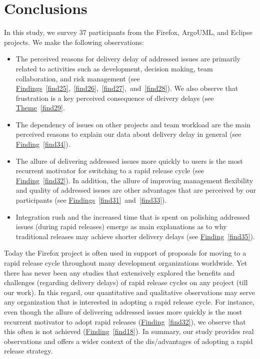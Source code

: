 \section{Conclusions} \label{ch6:conclusion}

In this study, we survey 37 participants from the Firefox, ArgoUML,
and Eclipse projects. We make the following observations:

\begin{itemize}

      \item  The perceived reasons for delivery delay of addressed issues
      	are primarily related to activities such as development, decision making, team
      	collaboration, and risk management (see
      	\hyperref[find25]{Findings}~\ref{find25},~\ref{find26},~\ref{find27},~and~\ref{find28}).
	We also observe that frustration is a key perceived consequence of
	dleivery delays (see \hyperref[th:4]{Theme}~\ref{find29}.

      \item  The dependency of issues on other projects and team workload are
	      the main perceived reasons to explain our data about delivery
	      delay in general (see \hyperref[find34]{Finding}~\ref{find34}).  
      	
      \item  The allure of delivering addressed issues more quickly to users is
	      the most recurrent motivator for switching to a rapid release
	      cycle (see \hyperref[find32]{Finding}~\ref{find32}). In addition, the
	      allure of improving management flexibility and quality of
	      addressed issues are other advantages that are perceived by our
	      participants (see
	      \hyperref[find31]{Findings}~\ref{find31}~and~\ref{find33}).

      \item Integration rush and the increased time that is spent on polishing
	      addressed issues (during rapid releases) emerge as main
	      explanations as to why traditional releases may achieve shorter
	      delivery delays (see \hyperref[find35]{Finding}~\ref{find35}).

\end{itemize}

Today the Firefox project is often used in support of proposals for moving to a
rapid release cycle throughout many development organizations worldwide. Yet
there has never been any studies that extensively explored the benefits and
challenges (regarding delivery delays) of rapid release cycles on any project
(till our work).  In this regard, our quantitative and qualitative observations
may serve any organization that is interested in adopting a rapid release cycle.
For instance, even though the allure of delivering addressed issues more quickly
is the most recurrent motivator to adopt rapid releases
(\hyperref[find32]{Finding}~\ref{find32}), we observe that this often is not achieved
(\hyperref[find18]{Finding}~\ref{find18}). In summary, our study provides real
observations and offers a wider context of the dis/advantages of adopting a
rapid release strategy.

